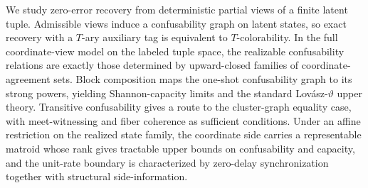 We study zero-error recovery from deterministic partial views of a finite latent tuple. Admissible views induce a confusability graph on latent states, so exact recovery with a $T$-ary auxiliary tag is equivalent to $T$-colorability. In the full coordinate-view model on the labeled tuple space, the realizable confusability relations are exactly those determined by upward-closed families of coordinate-agreement sets. Block composition maps the one-shot confusability graph to its strong powers, yielding Shannon-capacity limits and the standard Lov\'asz-$\vartheta$ upper theory. Transitive confusability gives a route to the cluster-graph equality case, with meet-witnessing and fiber coherence as sufficient conditions. Under an affine restriction on the realized state family, the coordinate side carries a representable matroid whose rank gives tractable upper bounds on confusability and capacity, and the unit-rate boundary is characterized by zero-delay synchronization together with structural side-information.
